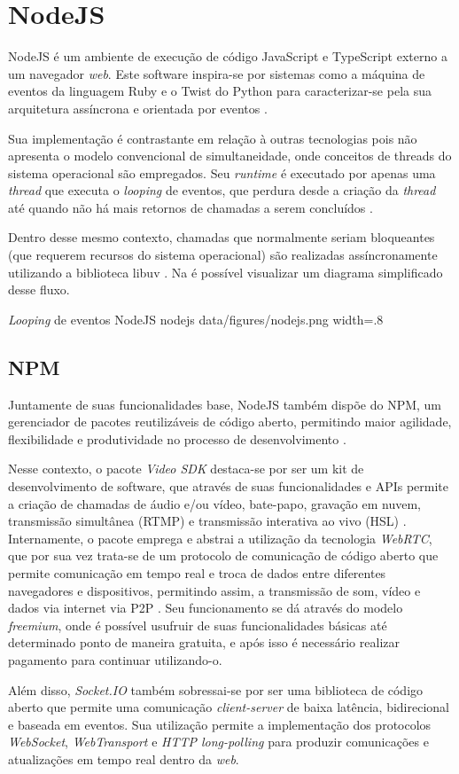 \section{NodeJS}
\label{sec:nodejs}
NodeJS é um ambiente de execução de código JavaScript e TypeScript externo a um navegador \textit{web}. Este software inspira-se por sistemas como a máquina de eventos da linguagem Ruby e o Twist do Python para caracterizar-se pela sua arquitetura assíncrona e orientada por eventos \cite{Foundation2023}. 

Sua implementação é contrastante em relação à outras tecnologias pois não apresenta o modelo convencional de simultaneidade, onde conceitos de threads do sistema operacional são empregados.  Seu \textit{runtime} é executado por apenas uma \textit{thread} que executa o \textit{looping} de eventos, que perdura desde a criação da \textit{thread} até quando não há mais retornos de chamadas a serem concluídos \cite{Foundation2023}.

Dentro desse mesmo contexto, chamadas que normalmente seriam bloqueantes (que requerem recursos do sistema operacional) são realizadas assíncronamente utilizando a biblioteca libuv \cite{ClaudioWunder}. Na  é possível visualizar um diagrama simplificado desse fluxo.

\image
    {\textit{Looping} de eventos NodeJS}
    {nodejs}
    {data/figures/nodejs.png}
    {width=.8\textwidth}
    {}

\subsection{NPM}
\label{sec:npm}
Juntamente de suas funcionalidades base, NodeJS também dispõe do NPM, um gerenciador de pacotes reutilizáveis de código aberto, permitindo maior agilidade, flexibilidade e produtividade no processo de desenvolvimento \cite{npm2022}.

Nesse contexto, o pacote \textit{Video SDK} destaca-se por ser um kit de desenvolvimento de software, que através de suas funcionalidades e APIs permite a criação de chamadas de áudio e/ou vídeo, bate-papo, gravação em nuvem, transmissão simultânea (RTMP) e transmissão interativa ao vivo (HSL) \cite{Video2023}. Internamente, o pacote emprega e abstrai a utilização da tecnologia \textit{WebRTC}, que por sua vez trata-se de um protocolo de comunicação de código aberto que permite comunicação em tempo real e troca de dados entre diferentes navegadores e dispositivos, permitindo assim, a transmissão de som, vídeo e dados via internet via P2P \cite{Network2023}. Seu funcionamento se dá através do modelo \textit{freemium}, onde é possível usufruir de suas funcionalidades básicas até determinado ponto de maneira gratuita, e após isso é necessário realizar pagamento para continuar utilizando-o. 

Além disso, \textit{Socket.IO} também sobressai-se por ser uma biblioteca de código aberto que permite uma comunicação \textit{client-server} de baixa latência, bidirecional e baseada em eventos. Sua utilização permite a implementação dos protocolos \textit{WebSocket}, \textit{WebTransport} e \textit{HTTP long-polling} para produzir comunicações e atualizações em tempo real dentro da \textit{web}. 